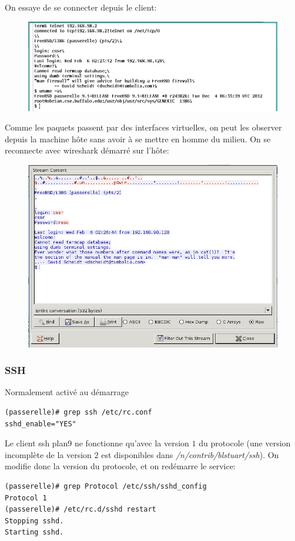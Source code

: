 \documentclass[a4paper]{article}
\begin{document}
On essaye de se connecter depuis le client:
\begin{figure}[!ht]
	\centering
	\includegraphics[scale=.5]{telnet.png}
\end{figure}

Comme les paquets passent par des interfaces virtuelles, on
peut les observer depuis la machine hôte sans avoir à se
mettre en homme du milieu. On se reconnecte avec wireshark
démarré sur l'hôte:
\begin{figure}[!ht]
	\centering
	\includegraphics[scale=.5]{telnetsniff.png}
\end{figure}

\subsubsection{SSH}
Normalement activé au démarrage
\begin{verbatim}
(passerelle)# grep ssh /etc/rc.conf 
sshd_enable="YES"
\end{verbatim}

Le client ssh plan9 ne fonctionne qu'avec la version $1$ du
protocole (une version incomplète de la version $2$ est
disponibles dans \textit{/n/contrib/blstuart/ssh}). On modifie
donc la version du protocole, et on redémarre le service:
\begin{verbatim}
(passerelle)# grep Protocol /etc/ssh/sshd_config
Protocol 1
(passerelle)# /etc/rc.d/sshd restart
Stopping sshd.
Starting sshd.
\end{verbatim}
\end{document}
